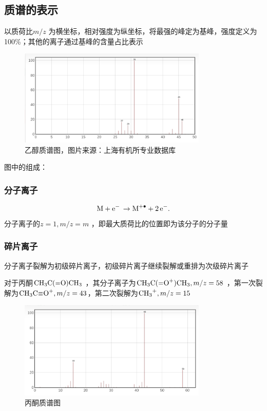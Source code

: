 \subsection{质谱的表示}%
\label{sub:质谱的表示}
以质荷比$m / z$ 为横坐标，相对强度为纵坐标，将最强的峰定为基峰，强度定义为100\%；其他的离子通过基峰的含量占比表示
\begin{figure}[htpb]
    \centering
    \includegraphics[width=0.8\textwidth]{./figures/乙醇质谱图.png}
    \caption{乙醇质谱图，图片来源：上海有机所专业数据库}
    \label{fig:-figures-乙醇质谱图-png}
\end{figure}
图中的组成：
\subsubsection*{分子离子}%
\label{subsub*:分子离子}
\[
    \ce{M + e- \to M^{+.} + 2e-}
.\]
分子离子的$z = 1, m / z = m$ ，即最大质荷比的位置即为该分子的分子量
\subsubsection*{碎片离子}%
\label{subsub*:碎片离子}
分子离子裂解为初级碎片离子，初级碎片离子继续裂解或重排为次级碎片离子
\begin{eg}
    对于丙酮$\ce{CH_3C(=O)CH_3}$ ，其分子离子为$\ce{CH_3C(=O+)CH_3}, m / z = 58$ ，第一次裂解为$\ce{CH_3C#O+}, m / z = 43$，第二次裂解为$\ce{CH_3+}, m / z = 15$ 
    \begin{figure}[htpb]
        \centering
        \includegraphics[width=0.8\textwidth]{./figures/丙酮质谱图.png}
        \caption{丙酮质谱图}
        \label{fig:-figures-丙酮质谱图-png}
    \end{figure}
\end{eg}
